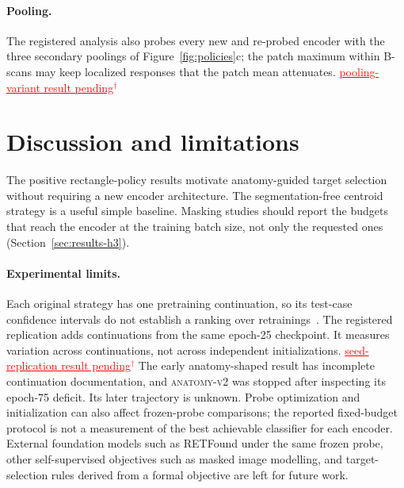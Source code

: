\documentclass{article}
\newcommand{\ph}[1]{\textcolor{red}{\underline{#1}$^{\dagger}$}}
\newcommand{\CRSeedResultsPending}{\ph{seed-replication result pending}}
\newcommand{\CRPoolingResultsPending}{\ph{pooling-variant result pending}}
\begin{document}
\paragraph{Pooling.} The registered analysis also probes every new and
re-probed encoder with the three secondary poolings of
Figure~\ref{fig:policies}c; the patch maximum within B-scans may keep localized
responses that the patch mean attenuates. \CRPoolingResultsPending

\section{Discussion and limitations}
\label{sec:limits}

The positive rectangle-policy results motivate anatomy-guided target
selection without requiring a new encoder architecture. The segmentation-free
centroid strategy is a useful simple baseline.
Masking studies should report the budgets that reach the encoder at the
training batch size, not only the requested ones (Section~\ref{sec:results-h3}).

\paragraph{Experimental limits.}
Each original strategy has one pretraining continuation, so its test-case
confidence intervals do not establish a ranking over
retrainings~\citep{bouthillier2021variance}. The registered replication adds
continuations from the same epoch-25 checkpoint. It measures variation across
continuations, not across independent initializations. \CRSeedResultsPending
The early anatomy-shaped result has incomplete continuation documentation,
and \textsc{anatomy-v2} was stopped after inspecting its epoch-75 deficit.
Its later trajectory is unknown. Probe optimization and initialization
can also affect frozen-probe comparisons; the reported fixed-budget
protocol is not a measurement of the best achievable classifier for each
encoder. External foundation models such as RETFound under the same frozen
probe, other self-supervised objectives such as masked image modelling, and
target-selection rules derived from a formal objective are left for future
work.
\end{document}
